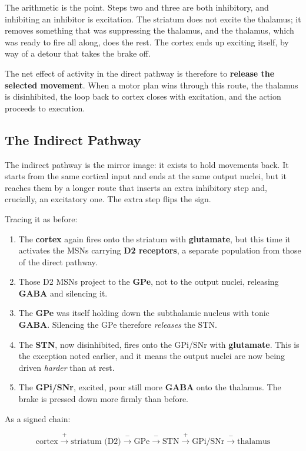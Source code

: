 \documentclass[11pt]{article}
\begin{document}
The arithmetic is the point. Steps two and three are both inhibitory, and inhibiting an inhibitor is excitation. The striatum does not excite the thalamus; it removes something that was suppressing the thalamus, and the thalamus, which was ready to fire all along, does the rest. The cortex ends up exciting itself, by way of a detour that takes the brake off.

The net effect of activity in the direct pathway is therefore to \textbf{release the selected movement}. When a motor plan wins through this route, the thalamus is disinhibited, the loop back to cortex closes with excitation, and the action proceeds to execution.

\subsection{The Indirect Pathway}

The indirect pathway is the mirror image: it exists to hold movements back. It starts from the same cortical input and ends at the same output nuclei, but it reaches them by a longer route that inserts an extra inhibitory step and, crucially, an excitatory one. The extra step flips the sign.

Tracing it as before:

\begin{enumerate}
    \item The \textbf{cortex} again fires onto the striatum with \textbf{glutamate}, but this time it activates the MSNs carrying \textbf{D2 receptors}, a separate population from those of the direct pathway.
    \item Those D2 MSNs project to the \textbf{GPe}, not to the output nuclei, releasing \textbf{GABA} and silencing it.
    \item The \textbf{GPe} was itself holding down the subthalamic nucleus with tonic \textbf{GABA}. Silencing the GPe therefore \textit{releases} the STN.
    \item The \textbf{STN}, now disinhibited, fires onto the GPi/SNr with \textbf{glutamate}. This is the exception noted earlier, and it means the output nuclei are now being driven \textit{harder} than at rest.
    \item The \textbf{GPi/SNr}, excited, pour still more \textbf{GABA} onto the thalamus. The brake is pressed down more firmly than before.
\end{enumerate}

As a signed chain:

\[
\text{cortex} \xrightarrow{\;+\;} \text{striatum (D2)} \xrightarrow{\;-\;} \text{GPe} \xrightarrow{\;-\;} \text{STN} \xrightarrow{\;+\;} \text{GPi/SNr} \xrightarrow{\;-\;} \text{thalamus}
\]
\end{document}
